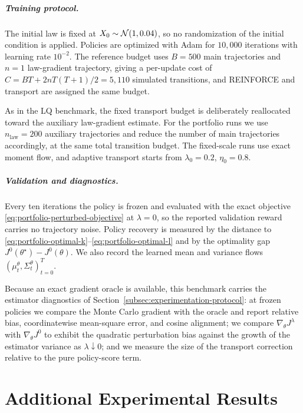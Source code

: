 \paragraph{Training protocol.}
The initial law is fixed at $X_0\sim{\cal N}(1,0.04)$, so no randomization of the initial condition is applied. Policies are optimized with Adam for $10{,}000$ iterations with learning rate $10^{-2}$. The reference budget uses $B=500$ main trajectories and $n=1$ law-gradient trajectory, giving a per-update cost of $C=BT+2nT(T+1)/2=5{,}110$ simulated transitions, and REINFORCE and transport are assigned the same budget.

As in the LQ benchmark, the fixed transport budget is deliberately reallocated toward the auxiliary law-gradient estimate. For the portfolio runs we use $n_{\mathrm{law}}=200$ auxiliary trajectories and reduce the number of main trajectories accordingly, at the same total transition budget. The fixed-scale runs use exact moment flow, and adaptive transport starts from $\lambda_0=0.2$, $\eta_0=0.8$.

\paragraph{Validation and diagnostics.}
Every ten iterations the policy is frozen and evaluated with the exact objective \eqref{eq:portfolio-perturbed-objective} at $\lambda=0$, so the reported validation reward carries no trajectory noise. Policy recovery is measured by the distance to \eqref{eq:portfolio-optimal-k}--\eqref{eq:portfolio-optimal-l} and by the optimality gap $J^0(\theta^\star)-J^0(\theta)$. We also record the learned mean and variance flows $(\mu_t^\theta,\Sigma_t^\theta)_{t=0}^T$.

Because an exact gradient oracle is available, this benchmark carries the estimator diagnostics of Section~\ref{subsec:experimentation-protocol}: at frozen policies we compare the Monte Carlo gradient with the oracle and report relative bias, coordinatewise mean-square error, and cosine alignment; we compare $\nabla_\theta J^\lambda$ with $\nabla_\theta J^0$ to exhibit the quadratic perturbation bias against the growth of the estimator variance as $\lambda\downarrow0$; and we measure the size of the transport correction relative to the pure policy-score term.


\chapter{Additional Experimental Results}
\label{appendix:experiments}


